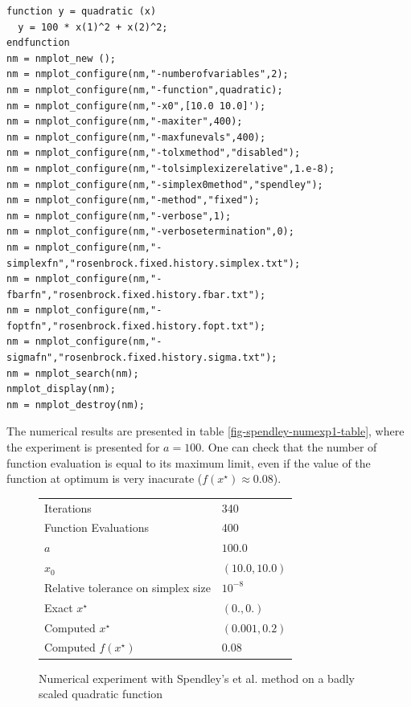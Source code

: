 \lstset{language=scilabscript}
\begin{lstlisting}
function y = quadratic (x)
  y = 100 * x(1)^2 + x(2)^2;
endfunction
nm = nmplot_new ();
nm = nmplot_configure(nm,"-numberofvariables",2);
nm = nmplot_configure(nm,"-function",quadratic);
nm = nmplot_configure(nm,"-x0",[10.0 10.0]');
nm = nmplot_configure(nm,"-maxiter",400);
nm = nmplot_configure(nm,"-maxfunevals",400);
nm = nmplot_configure(nm,"-tolxmethod","disabled");
nm = nmplot_configure(nm,"-tolsimplexizerelative",1.e-8);
nm = nmplot_configure(nm,"-simplex0method","spendley");
nm = nmplot_configure(nm,"-method","fixed");
nm = nmplot_configure(nm,"-verbose",1);
nm = nmplot_configure(nm,"-verbosetermination",0);
nm = nmplot_configure(nm,"-simplexfn","rosenbrock.fixed.history.simplex.txt");
nm = nmplot_configure(nm,"-fbarfn","rosenbrock.fixed.history.fbar.txt");
nm = nmplot_configure(nm,"-foptfn","rosenbrock.fixed.history.fopt.txt");
nm = nmplot_configure(nm,"-sigmafn","rosenbrock.fixed.history.sigma.txt");
nm = nmplot_search(nm);
nmplot_display(nm);
nm = nmplot_destroy(nm);
\end{lstlisting}


The numerical results are presented in table \ref{fig-spendley-numexp1-table},
where the experiment is presented for $a=100$. One can check that the 
number of function evaluation is equal to its maximum limit, even if the value of the 
function at optimum is very inacurate ($f(x^\star) \approx 0.08$).

\begin{figure}[h]
\begin{center}
\begin{tiny}
\begin{tabular}{|l|l|}
\hline
Iterations & 340 \\
Function Evaluations & 400 \\
$a$ & $100.0$ \\
$x_0$ & $(10.0,10.0)$ \\
Relative tolerance on simplex size & $10^{-8}$ \\
Exact $x^\star$ & $(0.,0.)$\\
Computed $x^\star$ & $(0.001,0.2)$\\
Computed $f(x^\star)$ & $0.08$\\
\hline
\end{tabular}
\end{tiny}
\end{center}
\caption{Numerical experiment with Spendley's et al. method on a badly scaled quadratic function}
\label{fig-spendley-numexp2-table}
\end{figure}



